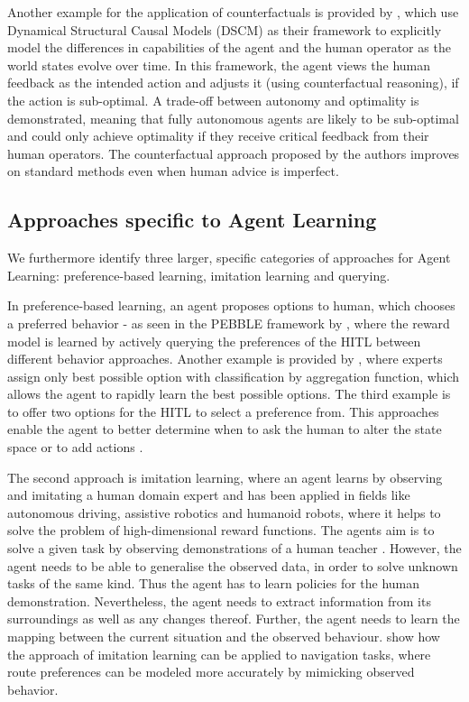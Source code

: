 \documentclass[twoside,11pt]{article}
\begin{document}
Another example for the application of counterfactuals is provided by \cite{Pearl:2009:Causality}, which use Dynamical Structural Causal Models (DSCM) as their framework to explicitly model the differences in capabilities of the agent and the human operator as the world states evolve over time. In this framework, the agent views the human feedback as the intended action and adjusts it (using counterfactual reasoning), if the action is sub-optimal. A trade-off between autonomy and optimality is demonstrated, meaning that fully autonomous agents are likely to be sub-optimal and could only achieve optimality if they receive critical feedback from their human operators. The counterfactual approach proposed by the authors improves on standard methods even when human advice is imperfect.



\subsection{Approaches specific to Agent Learning}

We furthermore identify three larger, specific categories of approaches for Agent Learning: preference-based learning, imitation learning and querying.

In preference-based learning, an agent proposes options to human, which chooses a preferred behavior - as seen in the PEBBLE framework by \cite{LeeSmithAbbeel:2021:FeedbackPreferenceHITLLearningPEBBLE}, where the reward model is learned by actively querying the preferences of the HITL between different behavior approaches. Another example is provided by \cite{HudecEtAl-2021-Interpretable}, where experts assign only best possible option with classification by aggregation function, which allows the agent to rapidly learn the best possible options. The third example is to offer two options for the HITL to select a preference from. This approaches enable the agent to better determine when to ask the human to alter the state space or to add actions \cite{MandelEtAl:2017ActionsInHITL}.

The second approach is imitation learning, where an agent learns by observing and imitating a human domain expert and has been applied in fields like autonomous driving, assistive robotics and humanoid robots, where it helps to solve the problem of high-dimensional reward functions. The agents aim is to solve a given task by observing demonstrations of a human teacher \cite{HusseinEtAl:2017:ImitationLearning}. However, the agent needs to be able to generalise the observed data, in order to solve unknown tasks of the same kind. Thus the agent has to learn policies for the human demonstration. Nevertheless, the agent needs to extract information from its surroundings as well as any changes thereof. Further, the agent needs to learn the mapping between the current situation and the observed behaviour. \cite{ZiebartEtAl:2008:ImitationLearningNavigation} show how the approach of imitation learning can be applied to navigation tasks, where route preferences can be modeled more accurately by mimicking observed behavior.
\end{document}
